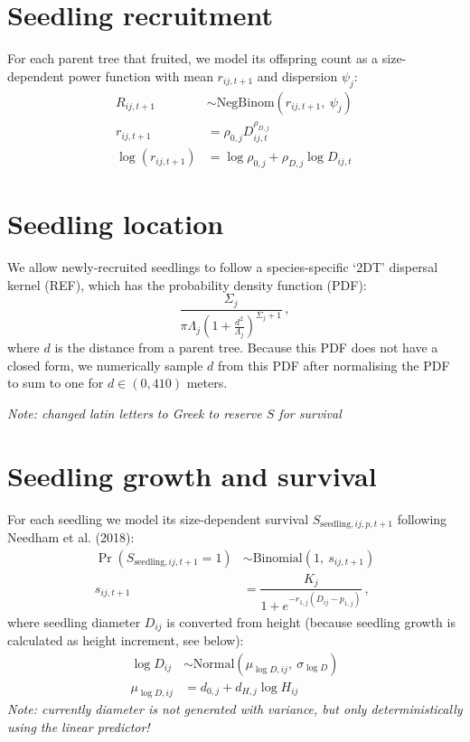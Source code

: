 \documentclass[12pt,a4paper]{article}
\begin{document}
\section{Seedling recruitment}
For each parent tree that fruited, we model its offspring count as a size-dependent power function with mean $r_{ij,t+1}$ and dispersion $\psi_j$:
\begin{align}
R_{ij,t+1} &\sim \text{NegBinom}\left(r_{ij,t+1},~\psi_j\right) \\
r_{ij,t+1} &=  \rho_{0,j} D_{ij,t}^{\rho_{D,j}} \label{eq:fruit} \\
\log\left(r_{ij,t+1}\right) &=  \log \rho_{0,j} + \rho_{D,j} \log D_{ij,t} \,
\end{align}

\section{Seedling location}
We allow newly-recruited seedlings to follow a species-specific `2DT' dispersal kernel (REF), which has the probability density function (PDF):
\begin{equation}
\frac{\Sigma_j}{\pi \Lambda_j \left(1 + \frac{d^2}{\Lambda_j}\right)^{\Sigma_j+1}} \,,
\end{equation}
where $d$ is the distance from a parent tree. Because this PDF does not have a closed form, we numerically sample $d$ from this PDF after normalising the PDF to sum to one for $d \in (0, 410)$ meters.

\textit{Note: changed latin letters to Greek to reserve $S$ for survival}

\section{Seedling growth and survival}
For each seedling we model its size-dependent survival $S_{\text{seedling},ij,p,t+1}$ following Needham et al. (2018):
\begin{align}
\Pr(S_{\text{seedling},ij,t+1} = 1) &\sim \text{Binomial}(1,~s_{ij,t+1}) \\
s_{ij,t+1} &= \dfrac{K_j}{1 + e^{-r_{1,j}  (D_{ij} - p_{1,j})}} \,, 
\end{align}
where seedling diameter $D_{ij}$ is converted from height (because seedling growth is calculated as height increment, see below):
\begin{align}
\log D_{ij} &\sim \text{Normal}(\mu_{\log D,ij},~\sigma_{\log D}) \\
\mu_{\log D,ij} &= d_{0,j} + d_{H,j} \log H_{ij}
\end{align}
\textit{Note: currently diameter is not generated with variance, but only deterministically using the linear predictor!}
\end{document}

